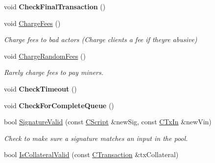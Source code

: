 \begin{DoxyCompactItemize}
\mbox{\label{class_c_obfuscation_pool_aa3303de165d9d72a5d67931b27d33487}} 
void {\bfseries Check\+Final\+Transaction} ()
\item 
\mbox{\label{class_c_obfuscation_pool_a683c9cff6eb710592b4cf81f3076fe25}} 
void \mbox{\hyperlink{class_c_obfuscation_pool_a683c9cff6eb710592b4cf81f3076fe25}{Charge\+Fees}} ()
\begin{DoxyCompactList}\small\item\em Charge fees to bad actors (Charge clients a fee if they\textquotesingle{}re abusive) \end{DoxyCompactList}\item 
\mbox{\label{class_c_obfuscation_pool_a5853e64dcd6b6125ba9e52688eee29a3}} 
void \mbox{\hyperlink{class_c_obfuscation_pool_a5853e64dcd6b6125ba9e52688eee29a3}{Charge\+Random\+Fees}} ()
\begin{DoxyCompactList}\small\item\em Rarely charge fees to pay miners. \end{DoxyCompactList}\item 
\mbox{\label{class_c_obfuscation_pool_a3fddcb7094b8a2635b53fed207a78246}} 
void {\bfseries Check\+Timeout} ()
\item 
\mbox{\label{class_c_obfuscation_pool_ad8fc2b9e329de37d3a78bcf51d475696}} 
void {\bfseries Check\+For\+Complete\+Queue} ()
\item 
\mbox{\label{class_c_obfuscation_pool_adcf5ed04bd7b28b8f8d95c839e175711}} 
bool \mbox{\hyperlink{class_c_obfuscation_pool_adcf5ed04bd7b28b8f8d95c839e175711}{Signature\+Valid}} (const \mbox{\hyperlink{class_c_script}{C\+Script}} \&new\+Sig, const \mbox{\hyperlink{class_c_tx_in}{C\+Tx\+In}} \&new\+Vin)
\begin{DoxyCompactList}\small\item\em Check to make sure a signature matches an input in the pool. \end{DoxyCompactList}\item 
\mbox{\label{class_c_obfuscation_pool_a821ebbd4ae62c5ad7e80e24a3038bdec}} 
bool \mbox{\hyperlink{class_c_obfuscation_pool_a821ebbd4ae62c5ad7e80e24a3038bdec}{Is\+Collateral\+Valid}} (const \mbox{\hyperlink{class_c_transaction}{C\+Transaction}} \&tx\+Collateral)

\end{DoxyCompactItemize}
